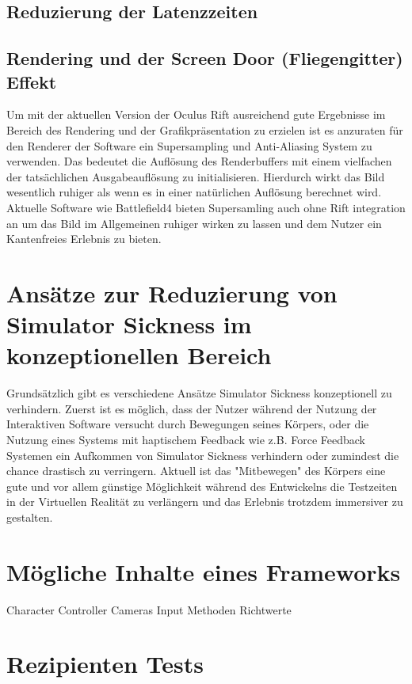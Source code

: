 \documentclass[pagesize, paper=a4, fontsize=12pt,titlepage=true, headings=small, headnosepline, abstractoff, liststotoc, nochapterprefix, plainheadsepline]{scrreprt}
\begin{document}
\subsection{Reduzierung der Latenzzeiten}


\subsection{Rendering und der Screen Door (Fliegengitter) Effekt}
Um mit der aktuellen Version der Oculus Rift ausreichend gute Ergebnisse im Bereich des Rendering und der Grafikpräsentation zu erzielen ist es anzuraten für den Renderer der Software ein Supersampling und Anti-Aliasing System zu verwenden. Das bedeutet die Auflösung des Renderbuffers mit einem vielfachen der tatsächlichen Ausgabeauflösung zu initialisieren. Hierdurch wirkt das Bild wesentlich ruhiger als wenn es in einer natürlichen Auflösung berechnet wird. Aktuelle Software wie Battlefield4 bieten Supersamling auch ohne Rift integration an um das Bild im Allgemeinen ruhiger wirken zu lassen und dem Nutzer ein Kantenfreies Erlebnis zu bieten.

\section{Ansätze zur Reduzierung von Simulator Sickness im konzeptionellen Bereich}
Grundsätzlich gibt es verschiedene Ansätze Simulator Sickness konzeptionell zu verhindern. Zuerst ist es möglich, dass der Nutzer während der Nutzung der Interaktiven Software versucht durch Bewegungen seines Körpers, oder die Nutzung eines Systems mit haptischem Feedback wie z.B. Force Feedback Systemen ein Aufkommen von Simulator Sickness verhindern oder zumindest die chance drastisch zu verringern. Aktuell ist das "Mitbewegen" des Körpers eine gute und vor allem günstige Möglichkeit während des Entwickelns die Testzeiten in der Virtuellen Realität zu verlängern und das Erlebnis trotzdem immersiver zu gestalten.

\section{}

\section{Mögliche Inhalte eines Frameworks}
Character Controller
Cameras
Input Methoden
Richtwerte

\section{Rezipienten Tests}
\end{document}
